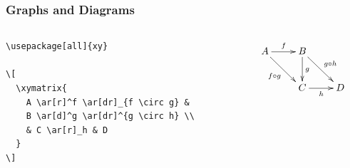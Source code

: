 \begin{frame}[fragile]
\frametitle{Graphs and Diagrams}

\begin{columns}
\begin{column}{.65\textwidth}
\begin{beamerboxesrounded}{}
\vspace{-1em}
\begin{lstlisting}[basicstyle=\ttfamily,escapechar=|,
emph={xy,xymatrix},moretexcs={color},commentstyle={},]
\usepackage[all]{xy}

\[
  \xymatrix{
    A \ar[r]^f \ar[dr]_{f \circ g} &
    B \ar[d]^g \ar[dr]^{g \circ h} \\
    & C \ar[r]_h & D
  }
\]
\end{lstlisting}
\vspace{-1em}
\end{beamerboxesrounded}
\end{column}
\hfill\begin{column}{.35\textwidth}
{\Large
\[
\xymatrix{
A \ar[r]^f \ar[dr]_{f \circ g}
& B \ar[d]^g \ar[dr]^{g \circ h} \\
& C \ar[r]_h & D
 }
\]
}
\end{column}
\end{columns}
\end{frame}


